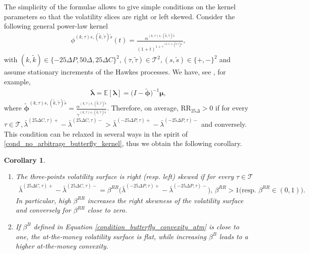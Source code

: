 \documentclass[12pt]{article}
\newtheorem{corollary}[theorem2]{Corollary}
\begin{document}
The simplicity of the formulae allows to give simple conditions on the kernel parameters so that the volatility slices are right or left skewed. Consider the following general power-law kernel
\begin{align}\label{power_law_kernel}
    \phi^{(k,\tau)s,(\tilde k,\tilde \tau)\tilde s}(t) = \frac{\alpha^{(k,\tau)s,(\tilde k,\tilde \tau)\tilde s}}{(1+t)^{1+\gamma^{(k,\tau)s,(\tilde k,\tilde \tau)\tilde s}}},
\end{align}
with $(k,\tilde k)\in \{-25\Delta P, 50\Delta, 25\Delta C\}^2,  (\tau,\tilde \tau)\in \mathcal{T}^2, (s,\tilde s)\in \{+,-\}^2$ and assume stationary increments of the Hawkes processes. We have, see \cite{bacry2015hawkes}, for example,
\begin{align*}%
    \boldsymbol{\bar \lambda} = \mathbb{E}[\boldsymbol{\lambda}] = \big(I - \boldsymbol{\tilde{\phi}}\big)^{-1}\boldsymbol{\mu}, 
\end{align*}
where $\boldsymbol{\tilde{\phi}}^{(k,\tau)s,(\tilde k,\tilde \tau)\tilde s} = \frac{\alpha^{(k,\tau)s,(\tilde k,\tilde \tau)\tilde s}}{\gamma^{(k,\tau)s,(\tilde k,\tilde \tau)\tilde s}}$. Therefore, on average, $\text{RR}_{25\Delta}>0$ if for every $\tau\in\mathcal{T}, \bar \lambda^{(25\Delta C,\tau)+}-\bar \lambda^{(25\Delta C,\tau)-} > \bar \lambda^{(-25\Delta P,\tau)+}-\bar \lambda^{(-25\Delta P,\tau)-}$ and conversely. This condition can be relaxed in several ways in the spirit of \eqref{cond_no_arbitrage_butterfly_kernel}, thus we obtain the following corollary. 
\begin{corollary}\label{corollary_3points}
\begin{enumerate}\leavevmode
    \item The three-points volatility surface is right (resp. left) skewed if for every $\tau\in\mathcal{T}$
\begin{align*}%
    \!\bar \lambda^{(25\Delta C,\tau)+}-\bar \lambda^{(25\Delta C,\tau)-} = \beta^{RR}\big( \bar \lambda^{(-25\Delta P,\tau)+}-\bar \lambda^{(-25\Delta P,\tau)-}\big), \, \beta^{RR}>1 \big(\text{resp. } \beta^{RR}\in(0,1)\big).
\end{align*}
In particular, high $\beta^{RR}$ increases the right skewness of the volatility surface and conversely for $\beta^{RR}$ close to zero.
    \item If $\beta^B$ defined in Equation \eqref{condition_butterfly_convexity_atm} is close to one, the at-the-money volatility surface is flat, while increasing $\beta^B$ leads to a higher at-the-money convexity. 
\end{enumerate} 
\end{corollary}
\end{document}
